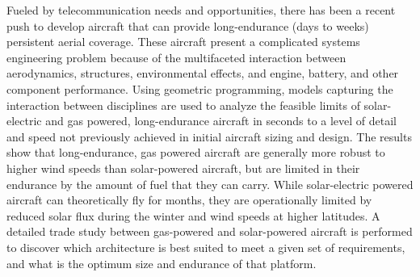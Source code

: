 % 
% 
%
    Fueled by telecommunication needs and opportunities, there has been a recent push to develop aircraft that can provide long-endurance (days to weeks) persistent aerial coverage.
    These aircraft present a complicated systems engineering problem because of the multifaceted interaction between aerodynamics, structures, environmental effects, and engine, battery, and other component performance.
    Using geometric programming, models capturing the interaction between disciplines are used to analyze the feasible limits of solar-electric and gas powered, long-endurance aircraft in seconds to a level of detail and speed not previously achieved in initial aircraft sizing and design. 
    The results show that long-endurance, gas powered aircraft are generally more robust to higher wind speeds than solar-powered aircraft, but are limited in their endurance by the amount of fuel that they can carry. 
    While solar-electric powered aircraft can theoretically fly for months, they are operationally limited by reduced solar flux during the winter and wind speeds at higher latitudes.
    A detailed trade study between gas-powered and solar-powered aircraft is performed to discover which architecture is best suited to meet a given set of requirements, and what is the optimum size and endurance of that platform.
